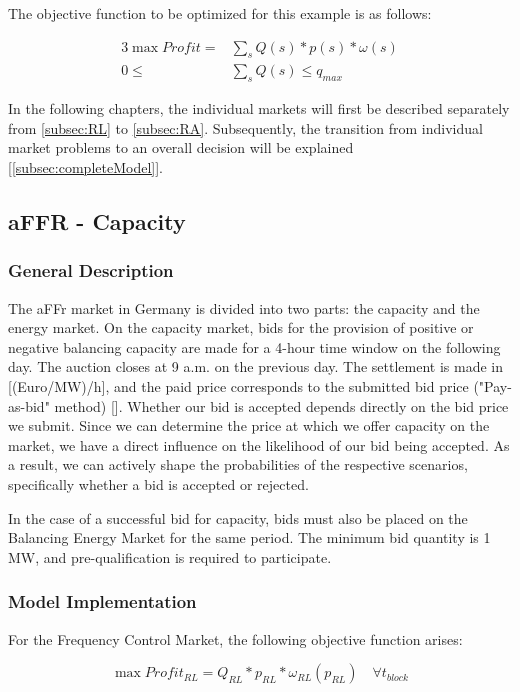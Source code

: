 The objective function to be optimized for this example is as follows:

\begin{alignat}{3}
	\max Profit = & \sum_{s} Q(s) * p(s) * \omega(s) \\
	0 \leq        & \sum_{s} Q(s) \leq q_{max}
\end{alignat}

In the following chapters, the individual markets will first be described separately from \autoref{subsec:RL} to \autoref{subsec:RA}.
Subsequently, the transition from individual market problems to an overall decision will be explained [\autoref{subsec:completeModel}].

\subsection{aFFR - Capacity}
\label{subsec:RL}

\subsubsection{General Description}
The aFFr market in Germany is divided into two parts: the capacity and the energy market.
On the capacity market, bids for the provision of positive or negative balancing capacity are made for a 4-hour time window on the following day.
The auction closes at 9 a.m. on the previous day.
The settlement is made in [(Euro/MW)/h], and the paid price corresponds to the submitted bid price ("Pay-as-bid" method) [\cite{.04.12.2024}].
Whether our bid is accepted depends directly on the bid price we submit.
Since we can determine the price at which we offer capacity on the market,
we have a direct influence on the likelihood of our bid being accepted.
As a result, we can actively shape the probabilities of the respective scenarios, specifically
whether a bid is accepted or rejected.

In the case of a successful bid for capacity, bids must also be placed on the Balancing Energy Market for the same period.
The minimum bid quantity is 1 MW, and pre-qualification is required to participate.

\subsubsection{Model Implementation}
For the Frequency Control Market, the following objective function arises:

\begin{equation}
	\max Profit_{RL} = Q_{RL} * p_{RL} * \omega_{RL}(p_{RL}) \quad \forall t_{block}
\end{equation}

